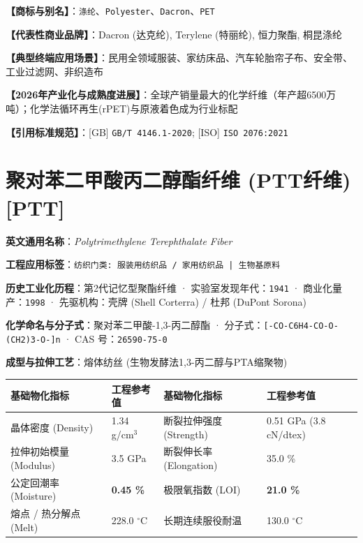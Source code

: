 \documentclass[11pt,openright,twoside,UTF8]{ctexbook}
\begin{document}
\noindent\textbf{【商标与别名】}：\texttt{涤纶}、\texttt{Polyester}、\texttt{Dacron}、\texttt{PET}\par
\noindent\textbf{【代表性商业品牌】}：Dacron (达克纶), Terylene (特丽纶), 恒力聚酯, 桐昆涤纶\par
\noindent\textbf{【典型终端应用场景】}：民用全领域服装、家纺床品、汽车轮胎帘子布、安全带、工业过滤网、非织造布\par
\noindent\textbf{【2026年产业化与成熟度进展】}：全球产销量最大的化学纤维（年产超6500万吨）；化学法循环再生(rPET)与原液着色成为行业标配\par
\noindent\textbf{【引用标准规范】}：[GB] \texttt{GB/T 4146.1-2020}; [ISO] \texttt{ISO 2076:2021}\par
\vspace{0.5cm}

\section{聚对苯二甲酸丙二醇酯纤维 (PTT纤维) [PTT]}
\label{sec:ptt}

\noindent\textbf{英文通用名称}：\textit{Polytrimethylene Terephthalate Fiber}\par
\noindent\textbf{工程应用标签}：\texttt{纺织门类: 服装用纺织品 / 家用纺织品 | 生物基原料}\par
\noindent\textbf{历史工业化历程}：第2代记忆型聚酯纤维 · 实验室发现年代：\texttt{1941} · 商业化量产：\texttt{1998} · 先驱机构：壳牌 (Shell Corterra) / 杜邦 (DuPont Sorona)\par
\noindent\textbf{化学命名与分子式}：聚对苯二甲酸-1,3-丙二醇酯 · 分子式：\texttt{[-CO-C6H4-CO-O-(CH2)3-O-]n} · CAS 号：\texttt{26590-75-0}\par
\noindent\textbf{成型与拉伸工艺}：熔体纺丝 (生物发酵法1,3-丙二醇与PTA缩聚物)\par

\vspace{0.15cm}
\begin{center}
\small
\begin{tabularx}{\textwidth}{p{3.8cm}Xp{3.8cm}X}
\toprule
\textbf{基础物化指标} & \textbf{工程参考值} & \textbf{基础物化指标} & \textbf{工程参考值} \\
\midrule
晶体密度 (Density) & 1.34 g/cm$^3$ & 断裂拉伸强度 (Strength) & 0.51 GPa (3.8 cN/dtex) \\
拉伸初始模量 (Modulus) & 3.5 GPa & 断裂伸长率 (Elongation) & 35.0 \% \\
公定回潮率 (Moisture) & \textbf{0.45 \%} & 极限氧指数 (LOI) & \textbf{21.0 \%} \\
熔点 / 热分解点 (Melt) & 228.0 $^\circ\mathrm{C}$ & 长期连续服役耐温 & 130.0 $^\circ\mathrm{C}$ \\
\bottomrule
\end{tabularx}
\end{center}
\vspace{0.15cm}
\end{document}
